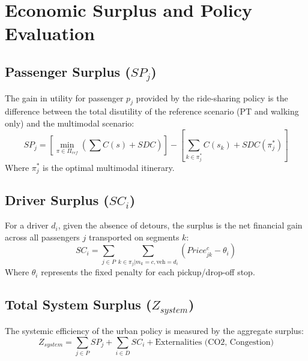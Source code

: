 \documentclass[12pt,a4paper]{article}
\begin{document}
\section{Economic Surplus and Policy Evaluation}

\subsection{Passenger Surplus ($SP_j$)}
The gain in utility for passenger $p_j$ provided by the ride-sharing policy is the difference between the total disutility of the reference scenario (PT and walking only) and the multimodal scenario:
\[ SP_j = \left[ \min_{\pi \in \Pi_{ref}} \left( \sum C(s) + SDC \right) \right] - \left[ \sum_{k \in \pi_j^*} C(s_k) + SDC(\pi_j^*) \right] \]
Where $\pi_j^*$ is the optimal multimodal itinerary.

\subsection{Driver Surplus ($SC_i$)}
For a driver $d_i$, given the absence of detours, the surplus is the net financial gain across all passengers $j$ transported on segments $k$:
\[ SC_i = \sum_{j \in P} \sum_{k \in \pi_j | m_k=c, \text{veh}=d_i} (Price^c_{jk} - \theta_i) \]
Where $\theta_i$ represents the fixed penalty for each pickup/drop-off stop.

\subsection{Total System Surplus ($Z_{system}$)}
The systemic efficiency of the urban policy is measured by the aggregate surplus:
\[ Z_{system} = \sum_{j \in P} SP_j + \sum_{i \in D} SC_i + \text{Externalities (CO2, Congestion)} \]
\end{document}
